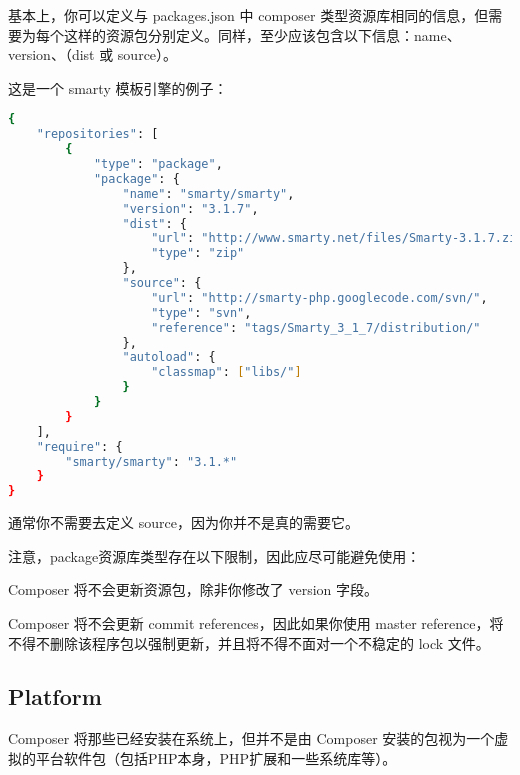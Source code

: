 基本上，你可以定义与 packages.json 中 composer 类型资源库相同的信息，但需要为每个这样的资源包分别定义。同样，至少应该包含以下信息：name、version、（dist 或 source）。

这是一个 smarty 模板引擎的例子：



\begin{lstlisting}[language=bash]
{
    "repositories": [
        {
            "type": "package",
            "package": {
                "name": "smarty/smarty",
                "version": "3.1.7",
                "dist": {
                    "url": "http://www.smarty.net/files/Smarty-3.1.7.zip",
                    "type": "zip"
                },
                "source": {
                    "url": "http://smarty-php.googlecode.com/svn/",
                    "type": "svn",
                    "reference": "tags/Smarty_3_1_7/distribution/"
                },
                "autoload": {
                    "classmap": ["libs/"]
                }
            }
        }
    ],
    "require": {
        "smarty/smarty": "3.1.*"
    }
}
\end{lstlisting}


通常你不需要去定义 source，因为你并不是真的需要它。

注意，package资源库类型存在以下限制，因此应尽可能避免使用：

\begin{compactitem}
\item Composer 将不会更新资源包，除非你修改了 version 字段。
\item Composer 将不会更新 commit references，因此如果你使用 master reference，将不得不删除该程序包以强制更新，并且将不得不面对一个不稳定的 lock 文件。
\end{compactitem}




\subsection{Platform}

Composer 将那些已经安装在系统上，但并不是由 Composer 安装的包视为一个虚拟的平台软件包（包括PHP本身，PHP扩展和一些系统库等）。

